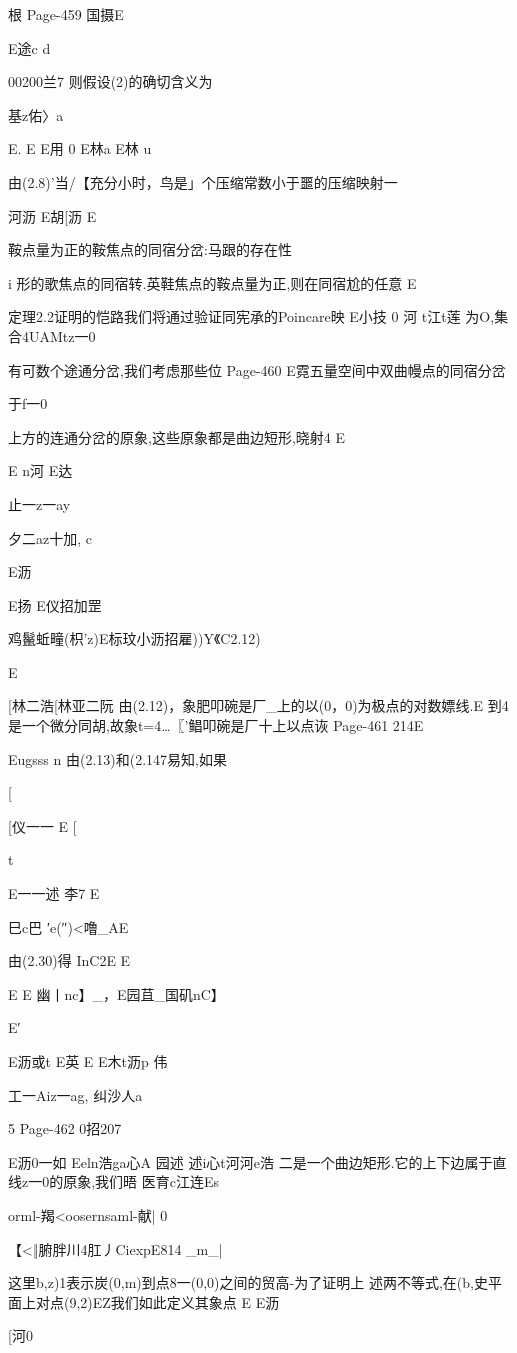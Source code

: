 {{{{{根
Page-459
国摄E

E途c
d

00200兰7
则假设(2)的确切含义为

基z佑〉a

E.
E
E用
0
E林a
E林
u

由(2.8)'当/【充分小时，鸟是」个压缩常数小于噩的压缩映射一

河沥
E胡[沥
E

鞍点量为正的鞍焦点的同宿分岔:马跟的存在性

i
形的歌焦点的同宿转.英鞋焦点的鞍点量为正,则在同宿尬的任意
E

定理2.2证明的恺路我们将通过验证同宪承的Poincare映
E小技
0
河
t江t莲
为O,集合4UAMtz一0}有可数个途通分岔,我们考虑那些位
Page-460
E霓五量空间中双曲幔点的同宿分岔

于f一0}上方的连通分岔的原象,这些原象都是曲边短形,晓射4
E

E
n河
E达

止一z一ay
{夕二az十加,
c

E沥

E扬
E仪招加罡

鸡鬣蚯疃(枳'z)E标玟小沥招雇))Y《C2.12)

E

[林二浩[林亚二阮
由(2.12)，象肥叩碗是厂_上的以(0，0)为极点的对数嫖线.E
到4是一个微分同胡,故象t=4…〖'鲳叩碗是厂十上以点诙
Page-461
214E

Eugsss
n
由(2.13)和(2.147易知,如果

[

[仪一一
E
[

t

E一一述
李7
E

巳c巴
′e(″)<噜_AE

由(2.30)得
InC2E
E

E
E
幽丨nc】_，E园苴_国矶nC】

E′

E沥或t
E英
E
E木t沥p
伟

工一Aiz一ag,
纠沙人a

5
Page-462
0招207

E沥0一如
Eeln浩ga心A
园述
述i心t河河e浩
二是一个曲边矩形.它的上下边属于直线{z一0}的原象,我们晤
医育c江连Es

orml-羯<oosernsaml-献|
0

【<‖腑胖川4肛丿CiexpE814
_m_|

这里b,z)1表示炭(0,m)到点8一(0,0)之间的贸高-为了证明上
述两不等式,在(b,史平面上对点(9,2)EZ我们如此定义其象点
E
E沥

[河0

}}}}
